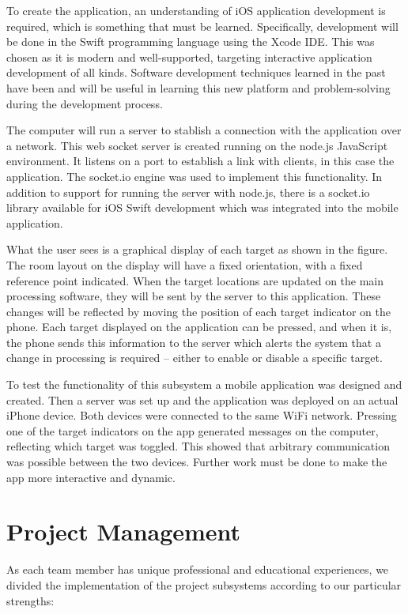 \documentclass[10pt,journal,compsoc]{IEEEtran}
\begin{document}
To create the application, an understanding of iOS application development is required, which is something that must be learned.  Specifically, development will be done in the Swift programming language using the Xcode IDE.  This was chosen as it is modern and well-supported, targeting interactive application development of all kinds. Software development techniques learned in the past have been and will be useful in learning this new platform and problem-solving during the development process.

The computer will run a server to stablish a connection with the application over a network.  This web socket server is created running on the node.js JavaScript environment.  It listens on a port to establish a link with clients, in this case the application. The socket.io engine was used to implement this functionality.  In addition to support for running the server with node.js, there is a socket.io library available for iOS Swift development which was integrated into the mobile application.

What the user sees is a graphical display of each target as shown in the figure.  The room layout on the display will have a fixed orientation, with a fixed reference point indicated.  When the target locations are updated on the main processing software, they will be sent by the server to this application.  These changes will be reflected by moving the position of each target indicator on the phone.  Each target displayed on the application can be pressed, and when it is, the phone sends this information to the server which alerts the system that a change in processing is required – either to enable or disable a specific target.


To test the functionality of this subsystem a mobile application was designed and created.  Then a server was set up and the application was deployed on an actual iPhone device.  Both devices were connected to the same WiFi network.  Pressing one of the target indicators on the app generated messages on the computer, reflecting which target was toggled.  This showed that arbitrary communication was possible between the two devices.  Further work must be done to make the app more interactive and dynamic.

\section{Project Management}

As each team member has unique professional and educational experiences, we divided the implementation of the project subsystems according to our particular strengths:
\end{document}
